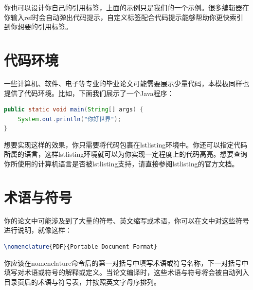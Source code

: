 \noindent 你也可以设计你自己的引用标签，上面的示例只是我们的一个示例。很多编辑器在你输入{\codefont ref}时会自动弹出代码提示，自定义标签配合代码提示能够帮助你更快索引到你想要的引用标签。

\section{代码环境}

一些计算机、软件、电子等专业的毕业论文可能需要展示少量代码，本模板同样也提供了代码环境。比如，下面我们展示了一个Java程序：

\begin{tcolorbox}
\begin{lstlisting}[language=Java]
public static void main(String[] args) {
    System.out.println("你好世界");
}
\end{lstlisting}
\end{tcolorbox}

想要实现这样的效果，你只需要将代码包裹在{\codefont lstlisting}环境中。你还可以指定代码所属的语言，这样{\codefont lstlisting}环境就可以为你实现一定程度上的代码高亮。想要查询你所使用的计算机语言是否被{\codefont lstlisting}支持，请直接参阅{\codefont lstlisting}的官方文档。

\section{术语与符号}

你的论文中可能涉及到了大量的符号、英文缩写或术语，你可以在文中对这些符号进行说明，就像这样：

\begin{tcolorbox}
\begin{lstlisting}[language=TeX]
\nomenclature{PDF}{Portable Document Format}
\end{lstlisting}
\end{tcolorbox}

\noindent 你应该在{\codefont nomenclature}命令后的第一对括号中填写术语或符号名称，下一对括号中填写对术语或符号的解释或定义。当论文编译时，这些术语与符号将会被自动列入目录页后的术语与符号表，并按照英文字母序排列。